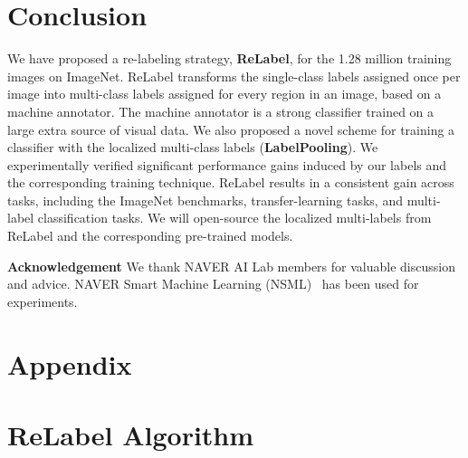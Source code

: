 \documentclass[final]{cvpr}
\newcommand\ours{{{\mbox{ReLabel}}}\xspace}
\newcommand\oursb{{\textbf{\mbox{ReLabel}}}\xspace}
\newcommand\ourframeworkb{{\textbf{{LabelPooling}}}\xspace}
\begin{document}
 \section{Conclusion}
We have proposed a re-labeling strategy, \oursb, for the 1.28 million training images on ImageNet. \ours transforms the single-class labels assigned once per image into multi-class labels assigned for every region in an image, based on a machine annotator. The machine annotator is a strong classifier trained on a large extra source of visual data. We also proposed a novel scheme for training a classifier with the localized multi-class labels (\ourframeworkb). We experimentally verified significant performance gains induced by our labels and the corresponding training technique. \ours results in a consistent gain across tasks, including the ImageNet benchmarks, transfer-learning tasks, and multi-label classification tasks. We will open-source the localized multi-labels from \ours and the corresponding pre-trained models.
 

\vspace{0.1cm}
\noindent\textbf{Acknowledgement}
{
\small
We thank NAVER AI Lab members for valuable discussion and advice.
NAVER Smart Machine Learning (NSML)~\cite{nsml} has been used for experiments.
}

{\small


}

\clearpage
\appendix
\onecolumn
\renewcommand{\thefigure}{A\arabic{figure}}
\setcounter{figure}{0}
\renewcommand{\thetable}{A\arabic{table}}
\setcounter{table}{0}
\renewcommand{\thealgorithm}{A\arabic{algorithm}}
\setcounter{algorithm}{0}

\section*{Appendix}

\section{\ours Algorithm}
\label{supp:algorithm}
\end{document}
